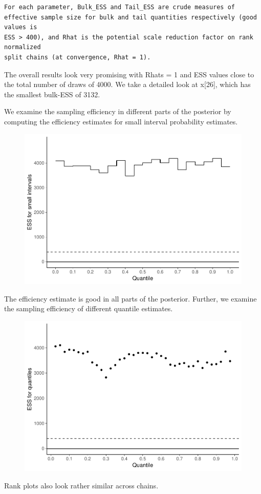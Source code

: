 \documentclass[american,]{article}
\begin{document}
\begin{verbatim}
For each parameter, Bulk_ESS and Tail_ESS are crude measures of 
effective sample size for bulk and tail quantities respectively (good values is 
ESS > 400), and Rhat is the potential scale reduction factor on rank normalized
split chains (at convergence, Rhat = 1).
\end{verbatim}

The overall results look very promising with Rhats = 1 and ESS values
close to the total number of draws of 4000. We take a detailed look at
x{[}26{]}, which has the smallest bulk-ESS of 3132.

We examine the sampling efficiency in different parts of the posterior
by computing the efficiency estimates for small interval probability
estimates.

\begin{figure}[tp]
  \centering
  \includegraphics[width=0.6\linewidth]{graphics/local-ess-jags-nom-1.pdf}
\end{figure}

The efficiency estimate is good in all parts of the posterior. Further,
we examine the sampling efficiency of different quantile estimates.

\begin{figure}[tp]
  \centering
  \includegraphics[width=0.6\linewidth]{graphics/quantile-ess-jags-nom-1.pdf}
\end{figure}

Rank plots also look rather similar across chains.
\end{document}
